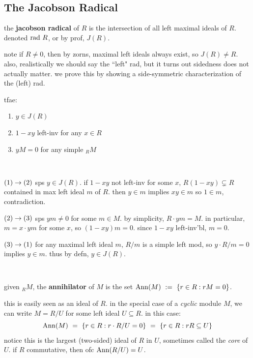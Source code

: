 \subsection{The Jacobson Radical}


\begin{defn}
    the \textbf{jacobson radical} of $R$ is the intersection of all left
	maximal ideals of $R$. denoted $\textrm{rad } R$, or by prof, $J(R)$.
\end{defn}
note if $R\neq0$, then by zorns, maximal left ideals always exist, so $J(R)\neq R$.
also, realistically we should say the ``left" rad, but it turns out
sidedness does not actually matter.
we prove this by showing a side-symmetric characterization of the (left) rad.

\begin{lm}
	tfae:
	\begin{enumerate}[(1)]
		\item $y\in J(R)$
		\item $1-xy$ left-inv for any $x\in R$
		\item $yM=0$ for any simple $_{R}M$
	\end{enumerate}
\end{lm} \

\begin{pf}[source=Primary Source Material]
	$(1)\rightarrow(2)$ sps $y\in J(R)$. if $1-xy$ not left-inv for some $x$,
	$R(1-xy)\subsetneq R$ contained in max left ideal $m$ of $R$.
	then $y\in m$ implies $xy\in m$ so $1\in m$, contradiction.

	$(2)\rightarrow(3)$ sps $ym\neq0$ for some $m \in M$. by simplicity, $R\cdot ym=M$.
	in particular, $m=x\cdot ym$ for some $x$, so $(1-xy)m=0$.
	since $1-xy$ left-inv'bl, $m=0$.

	$(3)\rightarrow(1)$ for any maximal left ideal $m$, $R/m$ is a simple left mod,
	so $y\cdot R/m=0$ implies $y\in m$. thus by defn, $y\in J(R)$.
\end{pf} \

\begin{defn}
    given $_{R}M$, the \textbf{annihilator} of $M$ is the set
	$\operatorname{Ann}(M) \ := \ \left\{{r\in R:rM=0}\right\}$.
\end{defn}
this is easily seen as an ideal of $R$.
in the special case of a \textit{cyclic} module $M$, we can write
$M=R/U$ for some left ideal $U\subseteq R$. in this case:
\begin{equation*}
    \operatorname{Ann}(M) \ = \ \left\{{r\in R:r\cdot R/U=0}\right\} \ = \ \left\{{r\in R:rR\subseteq U}\right\}
\end{equation*}
notice this is the largest (two-sided) ideal of $R$ in $U$, sometimes called
the \textit{core} of $U$. if $R$ commutative, then ofc $\operatorname{Ann}(R/U)=U$.

